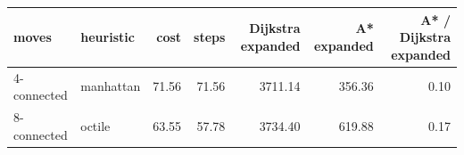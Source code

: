 \begin{tabular}{llrrrrr}
\toprule
moves & heuristic & cost & steps & Dijkstra expanded & A* expanded & A* / Dijkstra expanded \\
\midrule
4-connected & manhattan & 71.56 & 71.56 & 3711.14 & 356.36 & 0.10 \\
8-connected & octile & 63.55 & 57.78 & 3734.40 & 619.88 & 0.17 \\
\bottomrule
\end{tabular}

